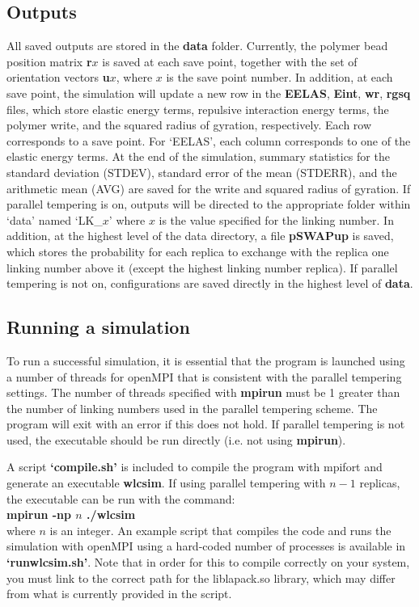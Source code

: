 \documentclass[english]{article}
\begin{document}
\begin{itemize}
\subsection{Outputs}

All saved outputs are stored in the \textbf{data} folder. Currently, the polymer bead position matrix \textbf{r$x$} is saved at each save point, together with the set of orientation vectors \textbf{u$x$}, where $x$ is the save point number. In addition, at each save point, the simulation will update a new row in the \textbf{EELAS}, \textbf{Eint}, \textbf{wr}, \textbf{rgsq} files, which store elastic energy terms, repulsive interaction energy terms, the polymer write, and the squared radius of gyration, respectively. Each row corresponds to a save point. For `EELAS', each column corresponds to one of the elastic energy terms. At the end of the simulation, summary statistics for the standard deviation (STDEV), standard error of the mean (STDERR), and the arithmetic mean (AVG) are saved for the write and squared radius of gyration. If parallel tempering is on, outputs will be directed to the appropriate folder within `data' named `LK\_$x$' where $x$ is the value specified for the linking number. In addition, at the highest level of the data directory, a file \textbf{pSWAPup} is saved, which stores the probability for each replica to exchange with the replica one linking number above it (except the highest linking number replica). If parallel tempering is not on, configurations are saved directly in the highest level of \textbf{data}. 

\subsection{Running a simulation}

To run a successful simulation, it is essential that the program is launched using a number of threads for openMPI that is consistent with the parallel tempering settings. The number of threads specified with \textbf{mpirun} must be 1 greater than the number of linking numbers used in the parallel tempering scheme. The program will exit with an error if this does not hold. If parallel tempering is not used, the executable should be run directly (i.e. not using \textbf{mpirun}). 

A script \textbf{`compile.sh'} is included to compile the program with mpifort and generate an executable \textbf{wlcsim}. If using parallel tempering with $n-1$ replicas, the executable can be run with the command: \\
\textbf{mpirun -np $n$ ./wlcsim}\\ 
where $n$ is an integer.  An example script that compiles the code and runs the simulation with openMPI using a hard-coded number of processes is available in \textbf{`runwlcsim.sh'}. Note that in order for this to compile correctly on your system, you must link to the correct path for the liblapack.so library, which may differ from what is currently provided in the script.


\end{itemize}
\end{document}

